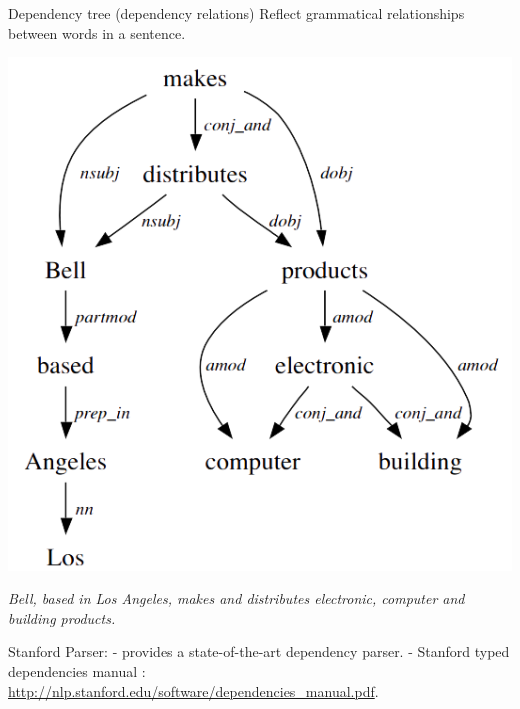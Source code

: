 \documentclass[10pt]{beamer}
\begin{document}
\begin{frame}

\begin{block}{Dependency tree (dependency relations)}
	Reflect grammatical relationships between words in a sentence.
	\begin{center}
		\includegraphics[scale=0.40]{depen.png}
			
		\textit{Bell, based in Los Angeles, makes and distributes electronic, computer and building products.}
	\end{center}
\end{block}

Stanford Parser:
	- provides a state-of-the-art dependency parser.
	- Stanford typed dependencies manual : \url{http://nlp.stanford.edu/software/dependencies_manual.pdf}.
		
\end{frame}

\end{document}
